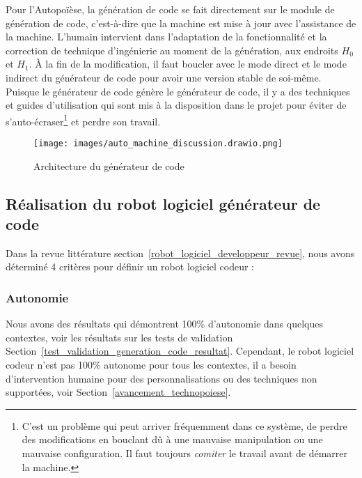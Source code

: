 Pour l'Autopoïèse, la génération de code se fait directement sur le module de génération de code, c'est-à-dire que la machine est mise à jour avec l'assistance de la machine. L'humain intervient dans l'adaptation de la fonctionnalité et la correction de technique d'ingénierie au moment de la génération, aux endroits $H_0$ et $H_1$. À la fin de la modification, il faut boucler avec le mode direct et le mode indirect du générateur de code pour avoir une version stable de soi-même. Puisque le générateur de code génère le générateur de code, il y a des techniques et guides d'utilisation qui sont mis à la disposition dans le projet pour éviter de s'auto-écraser\footnote{C'est un problème qui peut arriver fréquemment dans ce système, de perdre des modifications en bouclant dû à une mauvaise manipulation ou une mauvaise configuration. Il faut toujours \textit{comiter} le travail avant de démarrer la machine.} et perdre son travail.

\begin{figure}
\centering
\texttt{[image: images/auto\_machine\_discussion.drawio.png]}
\caption{Architecture du générateur de code}
\label{fig:dia_auto_machine_discussion}
\end{figure}

\subsection{Réalisation du robot logiciel générateur de code}
Dans la revue littérature section~\ref{robot_logiciel_developpeur_revue}, nous avons déterminé 4 critères pour définir un robot logiciel codeur :

\subsubsection{Autonomie}
Nous avons des résultats qui démontrent 100\% d'autonomie dans quelques contextes, voir les résultats sur les tests de validation Section~\ref{test_validation_generation_code_resultat}. Cependant, le robot logiciel codeur n'est pas 100\% autonome pour tous les contextes, il a besoin d'intervention humaine pour des personnalisations ou des techniques non supportées, voir Section~\ref{avancement_technopoiese}.


